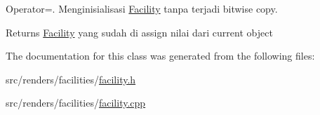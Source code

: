 Operator=. Menginisialisasi \hyperlink{classFacility}{Facility} tanpa terjadi bitwise copy. 

\begin{DoxyReturn}{Returns}
\hyperlink{classFacility}{Facility} yang sudah di assign nilai dari current object 
\end{DoxyReturn}


The documentation for this class was generated from the following files\+:\begin{DoxyCompactItemize}
\item 
src/renders/facilities/\hyperlink{facility_8h}{facility.\+h}\item 
src/renders/facilities/\hyperlink{facility_8cpp}{facility.\+cpp}\end{DoxyCompactItemize}
